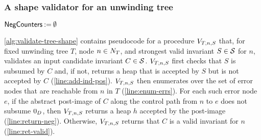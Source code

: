 \subsubsection{A shape validator for an unwinding tree}
\label{sec:tree-validator}
%
\begin{algorithm}[ht]
  $\mathsf{NegCounters} \mathbin{:=} \emptyset$ \label{line:init-negs} \;
  {
  }
  \Return{$\isvalid$} \label{line:ret-valid} \;
  \caption{$\treevalidate_{T, n, S}$: for a fixed unwinding tree $T$,
    control node $n \in \nodesnm_T$, and the strongest valid
    invariant $S$ for $n$, defines a validator for candidate shapes at
    $n$.
  }
  \label{alg:validate-tree-shape}
\end{algorithm}

\autoref{alg:validate-tree-shape} contains pseudocode for a procedure
$\treevalidate_{T, n, S}$ that, for fixed unwinding tree $T$, node $n
\in \nodesnm_T$, and strongest valid invariant $S \in \mathcal{S}$ for
$n$, validates an input candidate invariant $C \in \mathcal{S}$.
$\treevalidate_{T, n, S}$ first checks that $S$ is subsumed by $C$
and, if not, returns a heap that is accepted by $S$ but is not
accepted by $C$ (\autoref{line:add-ind-pos}).
%
$\treevalidate_{T, n, S}$ then enumerates over the set of error nodes
that are reachable from $n$ in $T$ (\autoref{line:enum-errs}).
%
For each such error node $e$, if the abstract post-image of $C$ along
the control path from $n$ to $e$ does not subsume $0_D$, then
$\treevalidate_{T, n, S}$ returns a heap $h$ accepted by the
post-image (\autoref{line:return-neg}).
%
Otherwise, $\treevalidate_{T, n, S}$ returns that $C$ is a valid
invariant for $n$ (\autoref{line:ret-valid}).


